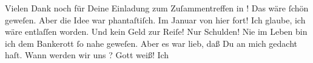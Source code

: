 \pstart
           {\pb}Vielen Dank noch für Deine Einladung zum
               Zuſammentreffen in \label{K_L02762-5v}\label{K_L02762-5}! Das wäre{ }ſchön
               geweſen. Aber die Idee war phantaſtiſch. Im Januar von
               hier fort! Ich glaube, ich wäre entlaſſen worden. Und kein Geld zur Reiſe! Nur
               Schulden! Nie im Leben bin ich dem Bankerott{ }ſo nahe geweſen. Aber es war lieb, daß
               Du an mich gedacht haſt. Wann {\pb}werden wir uns
                  \label{K_L02762-6v}\label{K_L02762-6}? Gott weiß! Ich

